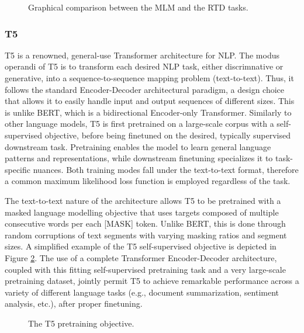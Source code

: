 \documentclass[preprint,review,10pt]{elsarticle}
\begin{document}
	\begin{figure}[H]
		
		\centering
		\caption{Graphical comparison between the MLM and the RTD tasks.}
		\label{fig::MLM-RTDTasks}
	\end{figure}
	
	\subsubsection{T5}
	T5 \cite{t5} is a renowned, general-use Transformer architecture for NLP. The modus operandi of T5 is to transform each desired NLP task, either discrimnative or generative, into a sequence-to-sequence mapping problem (text-to-text). Thus, it follows the standard Encoder-Decoder architectural paradigm, a design choice that allows it to easily handle input and output sequences of different sizes. This is unlike BERT, which is a bidirectional Encoder-only Transformer. Similarly to other language models, T5 is first pretrained on a large-scale corpus with a self-supervised objective, before being finetuned on the desired, typically supervised downstream task. Pretraining enables the model to learn general language patterns and representations, while downstream finetuning specializes it to task-specific nuances. Both training modes fall under the text-to-text format, therefore a common maximum likelihood loss function is employed regardless of the task.
	
	The text-to-text nature of the architecture allows T5 to be pretrained with a masked language modelling objective that uses targets composed of multiple consecutive words per each [MASK] token. Unlike BERT, this is done through random corruptions of text segments with varying masking ratios and segment sizes. A simplified example of the T5 self-supervised objective is depicted in Figure \ref{fig::T5objective}. The use of a complete Transformer Encoder-Decoder architecture, coupled with this fitting self-supervised pretraining task and a very large-scale pretraining dataset, jointly permit T5 to achieve remarkable performance across a variety of different language tasks (e.g., document summarization, sentiment analysis, etc.), after proper finetuning.
	
	\begin{figure}[H]
		
		\centering
		\caption{The T5 pretraining objective.}
		\label{fig::T5objective}
	\end{figure}
	
\end{document}
